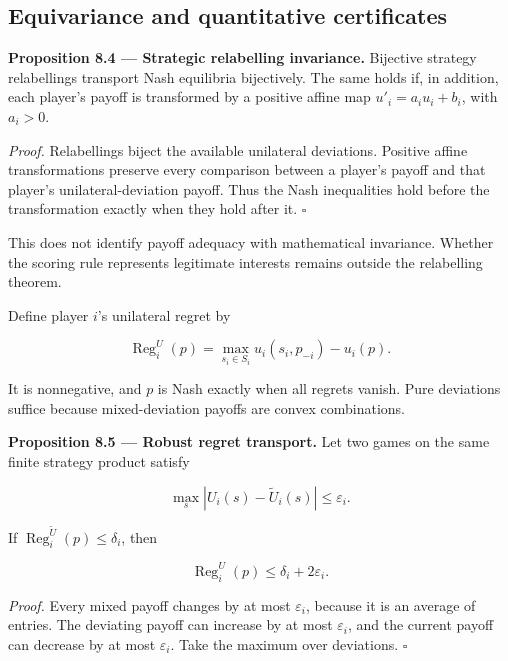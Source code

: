 \documentclass[11pt,a4paper]{article}
\begin{document}
\subsection{Equivariance and quantitative
certificates}\label{equivariance-and-quantitative-certificates}


\textbf{Proposition 8.4 --- Strategic relabelling invariance.} Bijective
strategy relabellings transport Nash equilibria bijectively. The same
holds if, in addition, each player's payoff is transformed by a positive
affine map \(u'_i=a_iu_i+b_i\), with \(a_i>0\).

\emph{Proof.} Relabellings biject the available unilateral deviations.
Positive affine transformations preserve every comparison between a
player's payoff and that player's unilateral-deviation payoff. Thus the
Nash inequalities hold before the transformation exactly when they hold
after it. \(\square\)

This does not identify payoff adequacy with mathematical invariance.
Whether the scoring rule represents legitimate interests remains outside
the relabelling theorem.

Define player \(i\)'s unilateral regret by

\nopagebreak[4]

\[
\operatorname{Reg}_i^U(p)=
\max_{s_i\in S_i}u_i(s_i,p_{-i})-u_i(p).
\]

It is nonnegative, and \(p\) is Nash exactly when all regrets vanish.
Pure deviations suffice because mixed-deviation payoffs are convex
combinations.


\textbf{Proposition 8.5 --- Robust regret transport.} Let two games on
the same finite strategy product satisfy

\nopagebreak[4]

\[\max_s|U_i(s)-\widetilde U_i(s)|\leq\varepsilon_i.\]

If \(\operatorname{Reg}_i^{\widetilde U}(p)\leq\delta_i\), then

\nopagebreak[4]

\[\operatorname{Reg}_i^U(p)\leq\delta_i+2\varepsilon_i.\]

\emph{Proof.} Every mixed payoff changes by at most \(\varepsilon_i\),
because it is an average of entries. The deviating payoff can increase
by at most \(\varepsilon_i\), and the current payoff can decrease by at
most \(\varepsilon_i\). Take the maximum over deviations. \(\square\)
\end{document}
